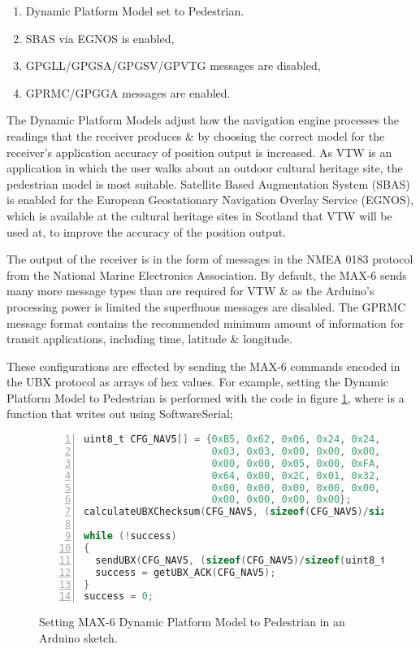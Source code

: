 \begin{enumerate}
	\item Dynamic Platform Model set to Pedestrian.
	\item SBAS via EGNOS is enabled,
	\item GPGLL/GPGSA/GPGSV/GPVTG messages are disabled,
	\item GPRMC/GPGGA messages are enabled.
\end{enumerate}

The Dynamic Platform Models adjust how the navigation engine processes the readings that the receiver produces \& by choosing the correct model for the receiver's application accuracy of position output is increased. As VTW is an application in which the user walks about an outdoor cultural heritage site, the pedestrian model is most suitable. Satellite Based Augmentation System (SBAS) is enabled for the European Geostationary Navigation Overlay Service (EGNOS), which is available at the cultural heritage sites in Scotland that VTW will be used at, to improve the accuracy of the position output.

The output of the receiver is in the form of messages in the NMEA 0183 protocol from the National Marine Electronics Association. By default, the MAX-6 sends many more message types than are required for VTW \& as the Arduino's processing power is limited the superfluous messages are disabled. The GPRMC message format contains the recommended minimum amount of information for transit applications, including time, latitude \& longitude.

These configurations are effected by sending the MAX-6 commands encoded in the UBX protocol as arrays of hex values. For example, setting the Dynamic Platform Model to Pedestrian is performed with the code in figure \ref{arduinoMAX6hex}, where  is a function that writes out using SoftwareSerial;

\begin{figure}[h]
\begin{lstlisting}[language=C, numbers=left, numberstyle=\small, stepnumber=1, frame=single, breaklines=true, backgroundcolor=\color{codebackground}, showstringspaces=false]
uint8_t CFG_NAV5[] = {0xB5, 0x62, 0x06, 0x24, 0x24, 0x00, 0xFF, 0xFF,
                      0x03, 0x03, 0x00, 0x00, 0x00, 0x00, 0x10, 0x27,
                      0x00, 0x00, 0x05, 0x00, 0xFA, 0x00, 0xFA, 0x00,
                      0x64, 0x00, 0x2C, 0x01, 0x32, 0x3C, 0x00, 0x00,
                      0x00, 0x00, 0x00, 0x00, 0x00, 0x00, 0x00, 0x00,
                      0x00, 0x00, 0x00, 0x00};
calculateUBXChecksum(CFG_NAV5, (sizeof(CFG_NAV5)/sizeof(uint8_t)));

while (!success)
{
  sendUBX(CFG_NAV5, (sizeof(CFG_NAV5)/sizeof(uint8_t)));
  success = getUBX_ACK(CFG_NAV5);
}
success = 0;
\end{lstlisting}
\caption{Setting MAX-6 Dynamic Platform Model to Pedestrian in an Arduino sketch.}
\label{arduinoMAX6hex}
\end{figure}

